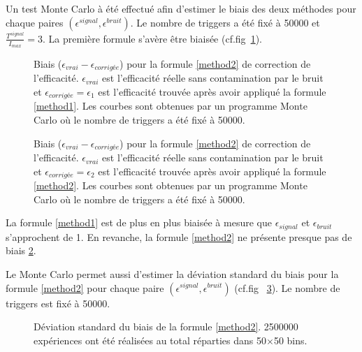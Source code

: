Un test Monte Carlo à été effectué afin d'estimer le biais des deux méthodes pour chaque paires $\left(\epsilon^{signal},\epsilon^{bruit}\right)$. Le nombre de triggers a été fixé à \num{50000} et $\frac{T^{signal}}{I_{max}}=3$. La première formule s'avère être biaisée (cf.fig~\ref{biaismethod1}).

\tikzexternaldisable
\begin{figure}[!ht]
\centering
{}
\caption{Biais ($\epsilon_{vrai} -\epsilon_{corrigée}$) pour la formule \ref{method2} de correction de l'efficacité. $\epsilon_{vrai}$ est l'efficacité réelle sans contamination par le bruit et $\epsilon_{corrigée}=\epsilon_{1}$ est l'efficacité trouvée après avoir appliqué la formule \ref{method1}. Les courbes sont obtenues par un programme Monte Carlo où le nombre de triggers a été fixé à \num{50000}.}
\label{biaismethod1}
\end{figure}

\begin{figure}[!ht]
	\centering
	\caption{Biais ($\epsilon_{vrai} -\epsilon_{corrigée}$) pour la formule \ref{method2} de correction de l'efficacité. $\epsilon_{vrai}$ est l'efficacité réelle sans contamination par le bruit et $\epsilon_{corrigée}=\epsilon_{2}$ est l'efficacité trouvée après avoir appliqué la formule \ref{method2}. Les courbes sont obtenues par un programme Monte Carlo où le nombre de triggers a été fixé à \num{50000}.}
	\label{biaismethod2}
\end{figure}


La formule \ref{method1} est de plus en plus biaisée à mesure que $\epsilon_{signal}$ et $\epsilon_{bruit}$ s'approchent de \num {1}. En revanche, la formule \ref{method2} ne présente presque pas de biais \ref{biaismethod2}.

\newpage
Le Monte Carlo permet aussi d'estimer la déviation standard du biais pour la formule \ref{method2} pour chaque paire $\left(\epsilon^{signal},\epsilon^{bruit}\right)$ (cf.fig~ \ref{RMSmethod2}). Le nombre de triggers est fixé à \num{50000}.

\begin{figure}[!ht]
	\centering
	\caption{Déviation standard du biais de la formule \ref{method2}. \num{2500000} expériences ont été réalisées au total réparties dans \num{50}$\times$\num{50} bins.}
	\label{RMSmethod2}
\end{figure}
\tikzexternalenable

